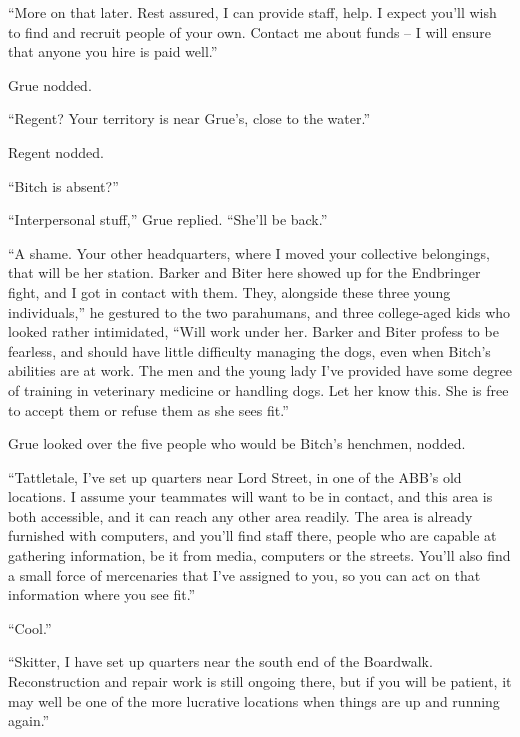 ``More on that later.  Rest assured, I can provide staff, help.  I expect you'll wish to find and recruit people of your own.  Contact me about funds – I will ensure that anyone you hire is paid well.''



Grue nodded.



``Regent?  Your territory is near Grue's, close to the water.''



Regent nodded.



``Bitch is absent?''



``Interpersonal stuff,'' Grue replied.  ``She'll be back.''



``A shame.  Your other headquarters, where I moved your collective belongings, that will be her station.  Barker and Biter here showed up for the Endbringer fight, and I got in contact with them.  They, alongside these three young individuals,'' he gestured to the two parahumans, and three college-aged kids who looked rather intimidated, ``Will work under her.  Barker and Biter profess to be fearless, and should have little difficulty managing the dogs, even when Bitch's abilities are at work.  The men and the young lady I've provided have some degree of training in veterinary medicine or handling dogs.  Let her know this.  She is free to accept them or refuse them as she sees fit.''



Grue looked over the five people who would be Bitch's henchmen, nodded.



``Tattletale, I've set up quarters near Lord Street, in one of the ABB's old locations.  I assume your teammates will want to be in contact, and this area is both accessible, and it can reach any other area readily.  The area is already furnished with computers, and you'll find staff there, people who are capable at gathering information, be it from media, computers or the streets.  You'll also find a small force of mercenaries that I've assigned to you, so you can act on that information where you see fit.''



``Cool.''



``Skitter, I have set up quarters near the south end of the Boardwalk.  Reconstruction and repair work is still ongoing there, but if you will be patient, it may well be one of the more lucrative locations when things are up and running again.''



